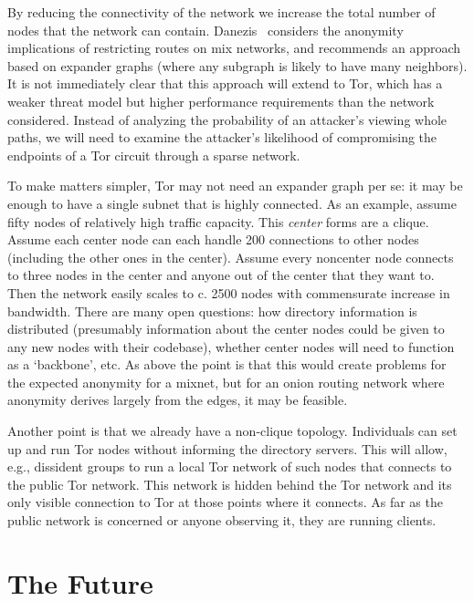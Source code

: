 \documentclass{llncs}
\begin{document}
By reducing the connectivity of the network we increase the total number of
nodes that the network can contain. Danezis~\cite{danezis-pets03} considers
the anonymity implications of restricting routes on mix networks, and
recommends an approach based on expander graphs (where any subgraph is likely
to have many neighbors).  It is not immediately clear that this approach will
extend to Tor, which has a weaker threat model but higher performance
requirements than the network considered.  Instead of analyzing the
probability of an attacker's viewing whole paths, we will need to examine the
attacker's likelihood of compromising the endpoints of a Tor circuit through
a sparse network.


To make matters simpler, Tor may not need an expander graph per se: it
may be enough to have a single subnet that is highly connected.  As an
example, assume fifty nodes of relatively high traffic capacity.  This
\emph{center} forms are a clique.  Assume each center node can each
handle 200 connections to other nodes (including the other ones in the
center). Assume every noncenter node connects to three nodes in the
center and anyone out of the center that they want to.  Then the
network easily scales to c. 2500 nodes with commensurate increase in
bandwidth. There are many open questions: how directory information
is distributed (presumably information about the center nodes could
be given to any new nodes with their codebase), whether center nodes
will need to function as a `backbone', etc. As above the point is
that this would create problems for the expected anonymity for a mixnet,
but for an onion routing network where anonymity derives largely from
the edges, it may be feasible.

Another point is that we already have a non-clique topology.
Individuals can set up and run Tor nodes without informing the
directory servers. This will allow, e.g., dissident groups to run a
local Tor network of such nodes that connects to the public Tor
network. This network is hidden behind the Tor network and its
only visible connection to Tor at those points where it connects.
As far as the public network is concerned or anyone observing it,
they are running clients.

\section{The Future}
\label{sec:conclusion}
\end{document}
